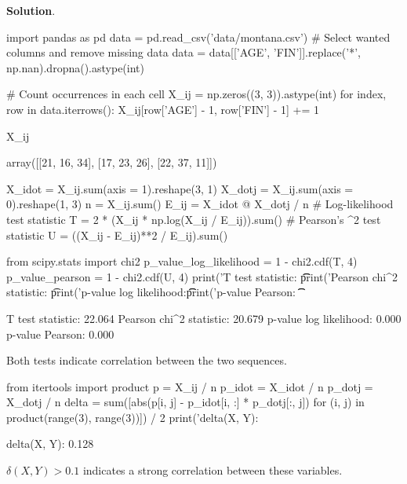 \textbf{Solution}.

\begin{python}
import pandas as pd
data = pd.read_csv('data/montana.csv')
# Select wanted columns and remove missing data
data = data[['AGE', 'FIN']].replace('*', np.nan).dropna().astype(int)
\end{python}

\begin{python}
# Count occurrences in each cell
X_ij = np.zeros((3, 3)).astype(int)
for index, row in data.iterrows():
     X_ij[row['AGE'] - 1, row['FIN'] - 1] += 1
           
X_ij
\end{python}
\begin{console}
array([[21, 16, 34],
       [17, 23, 26],
       [22, 37, 11]])
\end{console}

\begin{python}
X_idot = X_ij.sum(axis = 1).reshape(3, 1)
X_dotj = X_ij.sum(axis = 0).reshape(1, 3)
n = X_ij.sum()
E_ij = X_idot @ X_dotj / n
# Log-likelihood test statistic
T = 2 * (X_ij * np.log(X_ij / E_ij)).sum()
# Pearson's \chi^{2} test statistic
U = ((X_ij - E_ij)**2 / E_ij).sum()
\end{python}

\begin{python}
from scipy.stats import chi2
p_value_log_likelihood = 1 - chi2.cdf(T, 4)
p_value_pearson = 1 - chi2.cdf(U, 4)
print('T test statistic: \t\t%
print('Pearson chi^{2} statistic: \t%
print('p-value log likelihood:\t\t %
print('p-value Pearson: \t\t %
\end{python}
\begin{console}
T test statistic:               22.064
Pearson chi^{2} statistic:        20.679
p-value log likelihood:          0.000
p-value Pearson:                 0.000
\end{console}
Both tests indicate correlation between the two sequences.

\begin{python}
from itertools import product
p = X_ij / n
p_idot = X_idot / n
p_dotj = X_dotj / n
delta = sum([abs(p[i, j] - p_idot[i, :] * p_dotj[:, j]) 
            for (i, j) in product(range(3), range(3))]) / 2
print('delta(X, Y): %
\end{python}
\begin{console}
delta(X, Y): 0.128
\end{console}
\(\delta(X, Y) > 0.1\) indicates a strong correlation between these
variables.

